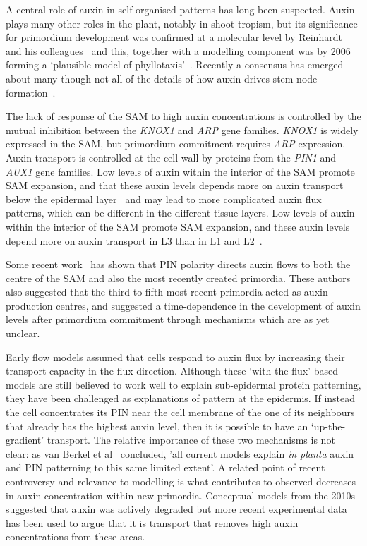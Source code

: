  A central role of auxin in self-organised patterns has long been suspected.  Auxin plays many other roles in the plant, notably in shoot tropism, but its significance for primordium development was confirmed at a molecular level by Reinhardt and his colleagues~\autocite{reinhardtRegulationPhyllotaxisPolar2003} and this, together with a modelling component was by 2006 forming a `plausible model of phyllotaxis'~\cite{smithPlausibleModelPhyllotaxis2006}. Recently a consensus has emerged about many though not all of the details of how auxin drives stem node formation~\autocite{shiPatterningShootApical2019}.

	 The lack of response of the SAM to high auxin concentrations is controlled by the mutual inhibition between the \textit{KNOX1} and \textit{ARP} gene families. \textit{KNOX1} is widely expressed in the SAM, but primordium commitment requires \textit{ARP} expression. Auxin transport is controlled at the cell wall by proteins from the \textit{PIN1} and \textit{AUX1} gene families.  Low levels of auxin within the interior of the SAM promote SAM expansion, and that these auxin levels depends more on auxin transport below the epidermal layer~\autocite{shiFeedbackLateralOrgans2018} and may lead to more complicated auxin flux patterns, which can be different in the different tissue layers. Low levels of auxin within the interior of the SAM promote SAM expansion, and these auxin levels depend more on auxin transport in L3 than in L1 and L2~\autocite{shiFeedbackLateralOrgans2018,shiPatterningShootApical2019}.


Some recent work~\autocite{galvan-ampudiaTemporalIntegrationAuxin2020} has shown that PIN polarity directs auxin flows to both the centre of the SAM and also the most recently created primordia. These authors also suggested that the third to fifth most recent primordia acted as auxin production centres, and suggested a time-dependence in the  development of auxin levels after primordium commitment through mechanisms which are as yet unclear. 

Early flow models assumed that cells respond to auxin flux by increasing their transport capacity in the flux direction. Although these `with-the-flux' based models are still believed to work well to explain  sub-epidermal protein patterning, they have been challenged as explanations of pattern at the epidermis.  If instead the cell concentrates its PIN near the cell membrane of the one of its neighbours that already has the highest auxin level, then it is possible to 
have an `up-the-gradient' transport. The relative importance of these two mechanisms is  not  clear: as van Berkel et al~\autocite{berkelPolarAuxinTransport2013} concluded, 'all current models explain \textit{in planta} auxin and PIN patterning to this same limited extent'. A related point of recent controversy and relevance to modelling is what contributes to observed decreases in auxin concentration within new primordia. Conceptual models from the 2010s suggested that auxin was actively degraded but more recent experimental data has been used to argue that it is transport that removes high auxin concentrations from these areas.

